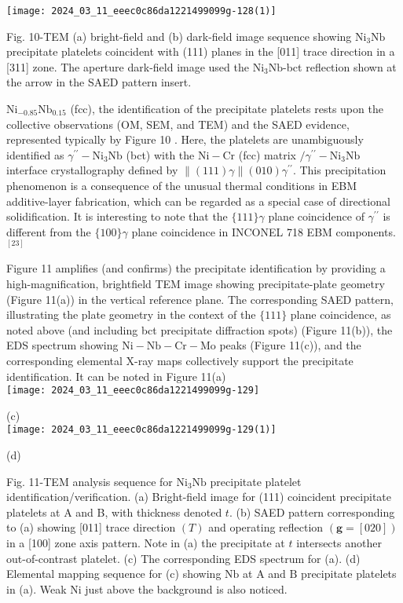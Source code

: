 \documentclass[10pt]{article}
\begin{document}
\begin{center}
\texttt{[image: 2024\_03\_11\_eeec0c86da1221499099g-128(1)]}
\end{center}

Fig. 10-TEM (a) bright-field and (b) dark-field image sequence showing $\mathrm{Ni}_{3} \mathrm{Nb}$ precipitate platelets coincident with (111) planes in the [011] trace direction in a [311] zone. The aperture dark-field image used the $\mathrm{Ni}_{3} \mathrm{Nb}$-bct reflection shown at the arrow in the SAED pattern insert.

$\mathrm{Ni}_{-0.85} \mathrm{Nb}_{0.15}$ (fcc), the identification of the precipitate platelets rests upon the collective observations (OM, SEM, and TEM) and the SAED evidence, represented typically by Figure 10 . Here, the platelets are unambiguously identified as $\gamma^{\prime \prime}-\mathrm{Ni}_{3} \mathrm{Nb}$ (bct) with the $\mathrm{Ni}-\mathrm{Cr}$ (fcc) matrix $/ \gamma^{\prime \prime}-\mathrm{Ni}_{3} \mathrm{Nb}$ interface crystallography defined by $\|(111) \gamma\|(010) \gamma^{\prime \prime}$. This precipitation phenomenon is a consequence of the unusual thermal conditions in EBM additive-layer fabrication, which can be regarded as a special case of directional solidification. It is interesting to note that the $\{111\} \gamma$ plane coincidence of $\gamma^{\prime \prime}$ is different from the $\{100\} \gamma$ plane coincidence in INCONEL 718 EBM components. ${ }^{[23]}$

Figure 11 amplifies (and confirms) the precipitate identification by providing a high-magnification, brightfield TEM image showing precipitate-plate geometry (Figure 11(a)) in the vertical reference plane. The corresponding SAED pattern, illustrating the plate geometry in the context of the $\{111\}$ plane coincidence, as noted above (and including bct precipitate diffraction spots) (Figure 11(b)), the EDS spectrum showing $\mathrm{Ni}-\mathrm{Nb}-\mathrm{Cr}-\mathrm{Mo}$ peaks (Figure 11(c)), and the corresponding elemental X-ray maps collectively support the precipitate identification. It can be noted in Figure 11(a)\\
\texttt{[image: 2024\_03\_11\_eeec0c86da1221499099g-129]}

(c)\\
\texttt{[image: 2024\_03\_11\_eeec0c86da1221499099g-129(1)]}

(d)

Fig. 11-TEM analysis sequence for $\mathrm{Ni}_{3} \mathrm{Nb}$ precipitate platelet identification/verification. (a) Bright-field image for (111) coincident precipitate platelets at A and B, with thickness denoted $t$. (b) SAED pattern corresponding to (a) showing [011] trace direction $(T)$ and operating reflection $(\mathbf{g}=[020])$ in a [100] zone axis pattern. Note in (a) the precipitate at $t$ intersects another out-of-contrast platelet. (c) The corresponding EDS spectrum for (a). (d) Elemental mapping sequence for (c) showing $\mathrm{Nb}$ at $\mathrm{A}$ and $\mathrm{B}$ precipitate platelets in (a). Weak Ni just above the background is also noticed.
\end{document}

